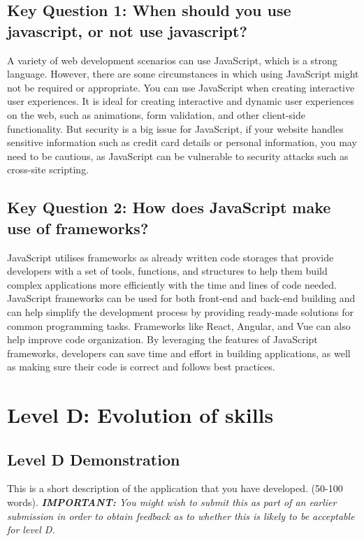 \documentclass[a4paper, 11pt]{report}
\begin{document}
\subsection{Key Question 1: When should you use javascript, or not use javascript?}
A variety of web development scenarios can use JavaScript, which is a strong language. However, there are some circumstances in which using JavaScript might not be required or appropriate. You can use JavaScript when creating interactive user experiences. It is ideal for creating interactive and dynamic user experiences on the web, such as animations, form validation, and other client-side functionality. But security is a big issue for JavaScript, if your website handles sensitive information such as credit card details or personal information, you may need to be cautious, as JavaScript can be vulnerable to security attacks such as cross-site scripting.
\cite{LevelC2}

\subsection{Key Question 2: How does JavaScript make use of frameworks?}
JavaScript utilises frameworks as already written code storages that provide developers with a set of tools, functions, and structures to help them build complex applications more efficiently with the time and lines of code needed. JavaScript frameworks can be used for both front-end and back-end building and can help simplify the development process by providing ready-made solutions for common programming tasks. Frameworks like React, Angular, and Vue can also help improve code organization. By leveraging the features of JavaScript frameworks, developers can save time and effort in building applications, as well as making sure their code is correct and follows best practices.
\cite{LevelC3}


\newpage
\section{Level D: Evolution of skills}
\vspace{5mm}
\subsection{Level D Demonstration}

This is a short description of the application that you have developed. (50-100 words).
\textit{{\bf IMPORTANT:} You might wish to submit this as part of an earlier submission in order to obtain feedback as to whether this is likely to be acceptable for level D.}
\end{document}

